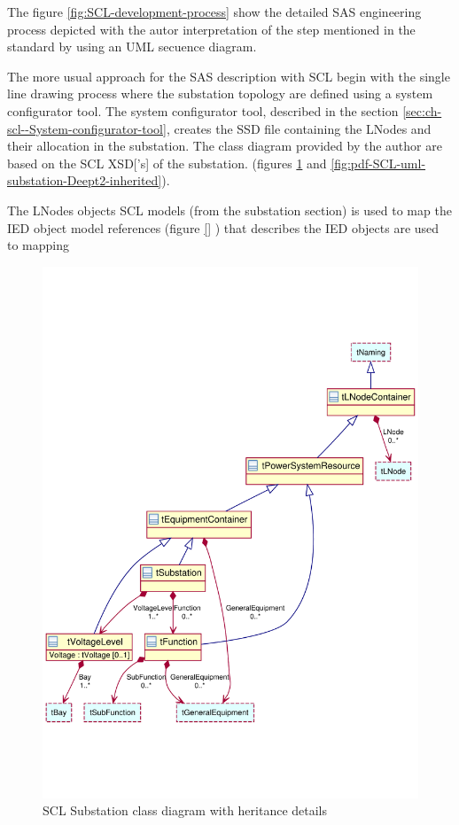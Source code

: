 The figure \ref{fig:SCL-development-process} 
show the detailed SAS engineering 
process depicted with 
the autor interpretation of the step 
mentioned in the standard by 
using an \gls{UML} secuence diagram.

The more usual approach for the \gls{SAS} description 
with \gls{SCL} begin with the 
single line drawing process where the 
substation topology are defined using a 
system configurator tool. The system configurator tool, 
described in the section \ref{sec:ch-scl--System-configurator-tool}, 
creates the \gls{SSD} file containing the \glspl{LNode}
and their allocation in the substation. 
The class diagram provided by the author 	 
are based on the \gls{SCL} 
\gls{XSD}['s] of the substation. (figures  
\ref{fig:pdf-SCL-uml-substation-Deept2} and 
\ref{fig:pdf-SCL-uml-substation-Deept2-inherited}).

The \glspl{LNode} objects SCL models 
(from the substation section) is used to map 
the \gls{IED} object model references  
(figure \ref{}
) 
that describes 
the \gls{IED} objects are used to mapping 


\begin{figure}
  \includegraphics[width=1.0\linewidth]{chapters/ch-scl/figures/SCL-uml-substation-Deept2}
  \caption{SCL Substation class diagram with heritance 
  details} 
  \label{fig:pdf-SCL-uml-substation-Deept2}
\end{figure}


